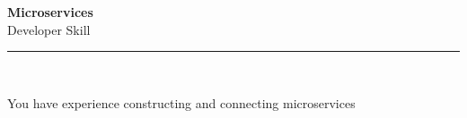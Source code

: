 \documentclass[11pt,a4paper]{memoir}
\begin{document}
    \begin{Spacing}{0.75}%
        \noindent
        \Large
        \textbf{Microservices}\\[3pt]
        \scriptsize\color{gray}Developer Skill\\ 
        \rule{\textwidth}{.3mm}\\
        
        \vspace{3mm}
        \noindent
        \begin{minipage}[t]{53mm}
            \begin{flushleft}
            {
                \normalsize
                \begin{Spacing}{1}%
                \color{black}\textrm{You have experience constructing and connecting microservices}\\
                \end{Spacing}
            }
            \end{flushleft}
        \end{minipage}

        \vspace{5mm}
        \noindent
        \begin{minipage}[t]{53mm}
            \begin{flushleft}
            {
                \normalsize
                \begin{Spacing}{1}%
                \color{gray}\textit{}\\
                \end{Spacing}
            }
            \end{flushleft}
        \end{minipage}
    \end{Spacing}
    \clearpage
\end{document}
